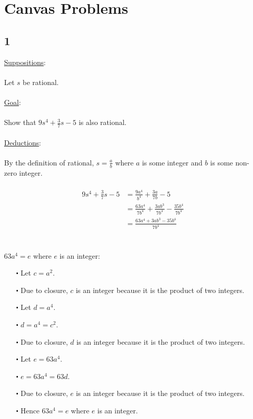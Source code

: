 \documentclass[12pt]{article}
\begin{document}
\section*{Canvas Problems}

\subsection*{1}
\underline{Suppositions}:
\\ \\
Let $s$ be rational.
\\ \\
\underline{Goal}:
\\ \\
Show that $9s^4 + \frac{3}{7}s -5$ is also rational. 
\\ \\
\underline{Deductions}:
\\ \\
By the definition of rational, $s = \frac{a}{b}$ where $a$ is some integer and $b$ is some non-zero integer.
\\ \\
\begin{align*}
  9s^4 + \frac{3}{7}s -5 &= \frac{9a^4}{b^4} + \frac{3a}{7b} - 5 \\
  &= \frac{63a^4}{7b^4} + \frac{3ab^3}{7b^4} - \frac{35b^4}{7b^4} \\
  &= \frac{63a^4 + 3ab^3 - 35b^4}{7b^4}
\end{align*}
\newblock
\\ \\
$63a^4 = e$ where $e$ is an integer:
\begin{itemize}
  \item [$\centerdot$] Let $c = a^2$. 
  \item [$\centerdot$] Due to closure, $c$ is an integer because it is the product of two integers.
  \item [$\centerdot$] Let $d = a^4$.
  \item [$\centerdot$] $d = a^4 = c^2$. 
  \item [$\centerdot$] Due to closure, $d$ is an integer because it is the product of two integers.
  \item [$\centerdot$] Let $e = 63a^4$.
  \item [$\centerdot$] $e = 63a^4 = 63d$.
  \item [$\centerdot$] Due to closure, $e$ is an integer because it is the product of two integers.
  \item [$\centerdot$] Hence $63a^4 = e$ where $e$ is an integer.
\end{itemize}
\end{document}
